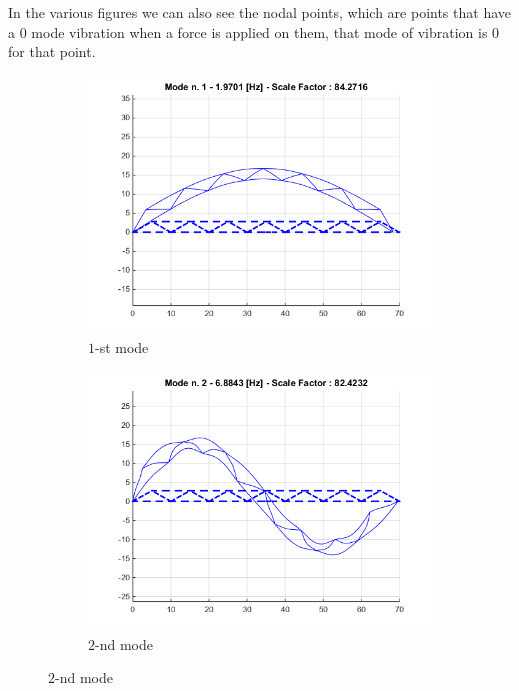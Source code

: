 \documentclass[10pt,a4paper,final]{report}
\begin{document}
In the various figures we can also see the nodal points, which are points that have a 0 mode vibration when a force is applied on them, that mode of vibration is $0$ for that point.
\newpage
\begin{figure}[h]
        \centering
        \begin{subfigure}[t]{0.3\textwidth}
                \includegraphics[width=\textwidth]{mode1}
                \caption{$1$-st mode}
                \label{fig:mode1}
        \end{subfigure}%
        \begin{subfigure}[t]{0.3\textwidth}
                \includegraphics[width=\textwidth]{mode2}
                \caption{$2$-nd mode}
                \label{fig:mode2}

\end{subfigure}
\end{figure}
\end{document}
